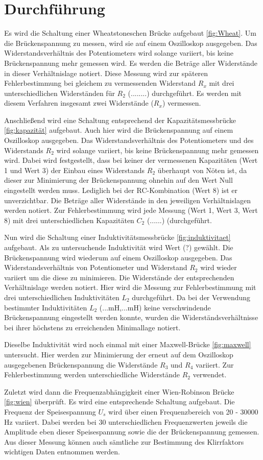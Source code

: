 \section{Durchführung}
\label{sec:Durchführung}

Es wird die Schaltung einer Wheatstoneschen Brücke aufgebaut \ref{fig:Wheat}.
Um die Brückenspannung zu messen, wird sie auf einem Oszilloskop ausgegeben.
Das Widerstandsverhältnis des Potentiometers wird solange variiert, bis keine
Brückenspannung mehr gemessen wird. Es werden die Beträge aller Widerstände in
dieser Verhältnislage notiert. Diese Messung wird zur späteren Fehlerbestimmung bei gleichem zu
vermessenden Widerstand $R_x$ mit drei unterschiedlichen Widerständen für $R_2$ (........) durchgeführt.
Es werden mit diesem Verfahren insgesamt zwei Widerstände ($R_x$) vermessen.

Anschließend wird eine Schaltung entsprechend der Kapazitätsmessbrücke \ref{fig:kapazität}
aufgebaut. Auch hier wird die Brückenspannung auf einem Oszilloskop ausgegeben.
Das Widerstandsverhältnis des Potentiometers und des Widerstands $R_2$ wird solange variiert, bis keine
Brückenspannung mehr gemessen wird. Dabei wird festgestellt, dass bei keiner der
vermessenen Kapazitäten (Wert 1 und Wert 3) der Einbau eines Widerstands $R_2$
überhaupt von Nöten ist, da dieser zur Minimierung der Brückenspannung ohnehin auf
den Wert Null eingestellt werden muss. Lediglich bei der RC-Kombination (Wert 8)
ist er unverzichtbar. Die Beträge aller Widerstände in den jeweiligen Verhältnislagen
werden notiert. Zur Fehlerbestimmung wird jede Messung (Wert 1, Wert 3, Wert 8)
mit drei unterschiedlichen Kapazitäten $C_2$ (......) (durchgeführt.

Nun wird die Schaltung einer Induktivitätsmessbrücke \ref{fig:induktivitaet} aufgebaut.
Als zu untersuchende Induktivität wird Wert (?) gewählt.
Die Brückenspannung wird wiederum auf einem Oszilloskop ausgegeben.
Das Widerstandsverhältnis von Potentiometer und Widerstand $R_2$ wird wieder
variiert um die diese zu minimieren. Die Widerstände der entsprechenden
Verhältnislage werden notiert. Hier wird die Messung zur Fehlerbestimmung mit
drei unterschiedlichen Induktivitäten $L_2$ durchgeführt.
Da bei der Verwendung bestimmter Induktivitäten $L_2$ (...mH,...mH) keine verschwindende
Brückenspannung eingestellt werden konnte, wurden die Widerständsverhältnisse
bei ihrer höchstens zu erreichenden Minimallage notiert.

Dieselbe Induktivität wird noch einmal mit einer Maxwell-Brücke \ref{fig:maxwell} untersucht.
Hier werden zur Minimierung der erneut auf dem Oszilloskop ausgegebenen Brückenspannung
die Widerstände $R_3$ und $R_4$ variiert. Zur Fehlerbestimmung werden unterschiedliche
Widerstände $R_2$ verwendet.

Zuletzt wird dann die Frequenzabhängigkeit einer Wien-Robinson Brücke \ref{fig:wien}
überprüft. Es wird eine entsprechende Schaltung aufgebaut. Die Frequenz der
Speisespannung $U_s$ wird über einen Frequenzbereich von 20 - 30000 Hz variiert.
Dabei werden bei 30 unterschiedlichen Frequenzwerten jeweils die Amplitude eben dieser
Speisespannung sowie die der Brückenspannung gemessen. Aus dieser Messung können
auch sämtliche zur Bestimmung des Klirrfaktors wichtigen Daten entnommen werden.
